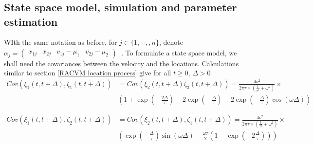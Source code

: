 \documentclass[11pt]{article}
\newcommand {\1}{\mathbb{1}}
\begin{document}
\subsection{State space model, simulation and parameter estimation}
WIth the same notation as before, for $j \in \{1,\cdots,,n\}$, denote $\alpha_j=\begin{pmatrix} x_{1j} & x_{2j} & v_{1j}-\mu_1 & v_{2j}-\mu_2 \end{pmatrix}^\top$.
To formulate a state space model, we shall need the covariances between the velocity and the locations.
Calculations similar to  section \ref{RACVM location process} give for all $t \geq 0$, $\Delta >0$
\begin{align*}
	Cov(\xi_1(t,t+\Delta),\zeta_1(t,t+\Delta))&=Cov(\xi_2(t,t+\Delta)\zeta_2(t,t+\Delta))=\frac{4\nu^2}{2 \pi \tau \times \left( \frac{1}{\tau^2}+\omega^2\right)} \times \\
	& \left( 1+\exp\left( -\frac{2\Delta}{\tau}\right)-2\exp\left( -\frac{\Delta}{\tau}\right)-2\exp\left( -\frac{\Delta}{\tau}\right) \cos(\omega \Delta)\right)
\end{align*}

\begin{align*}
	Cov(\xi_1(t,t+\Delta),\zeta_2(t,t+\Delta))&=Cov(\xi_2(t,t+\Delta),\zeta_1(t,t+\Delta))=\frac{4\nu^2}{2 \pi \tau \times \left( \frac{1}{\tau^2}+\omega^2\right)} \times \\
	&\left( \exp\left( -\frac{\Delta}{\tau}\right) \sin(\omega \Delta)-\frac{\omega \tau}{2} \left(1-\exp\left( -2 \frac{\Delta}{\tau}\right) \right)\right)
\end{align*}
\end{document}
